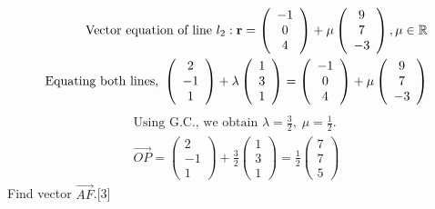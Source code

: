 \documentclass[12pt, a4 paper]{article}
\begin{document}
\begin{outline}[enumerate]
\begin{align*}
						{\textrm{Vector equation of line }}{l_2}:{\bf{r}} = \left( {\begin{array}{*{20}{c}}{ - 1} \\0\\4\end{array}} \right) + \mu \left({\begin{array}{*{20}{c}}9\\7\\{ - 3}\end{array}} \right),\mu  \in \mathbb{R}\\{\textrm{Equating both lines, }}\left( {\begin{array}{*{20}{c}}2\\{ - 1}\\1\end{array}} \right) + \lambda \left({\begin{array}{*{20}{c}}1\\3\\1\end{array}} \right) = \left( {\begin{array}{*{20}{c}}{ - 1}\\0\\4\end{array}} \right) + \mu \left({\begin{array}{*{20}{c}}9\\7\\{ - 3}\end{array}} \right)\\\end{align*}\begin{align*}{\textrm{Using G.C., we obtain }}\lambda  = \frac{3}{2},\;\mu  = \frac{1}{2}.\\\overrightarrow {OP}  = \left( {\begin{array}{*{20}{c}}2\\{ - 1}\\1\end{array}} \right) + \frac{3}{2}\left( {\begin{array}{*{20}{c}}1\\3\\1\end{array}} \right) = \frac{1}{2}\left({\begin{array}{*{20}{c}}7\\7\\5\end{array}} \right)
					\end{align*}
					\color{black}
					\2 Find vector $\overrightarrow {AF}$.\hfill[3]

\end{outline}
\end{document}
